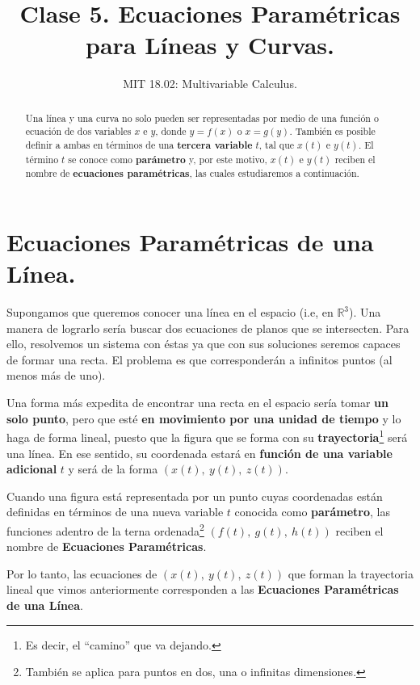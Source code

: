 \documentclass[12pt]{article}
\title{Clase 5. Ecuaciones Paramétricas para Líneas y Curvas.}
\author{MIT 18.02: Multivariable Calculus.}
\date{}
\begin{document}
\maketitle

\begin{abstract}
\noindent Una línea y una curva no solo pueden ser representadas por medio de una función o ecuación de dos variables $x$ e $y$, donde $y = f(x)$ o $x = g(y)$. También es posible definir a ambas en términos de una \textbf{tercera variable} $t$, tal que $x(t)$ e $y(t)$. El término $t$ se conoce como \textbf{parámetro} y, por este motivo, $x(t)$ e $y(t)$ reciben el nombre de \textbf{ecuaciones paramétricas}, las cuales estudiaremos a continuación.
\end{abstract}


\section{Ecuaciones Paramétricas de una Línea.}

Supongamos que queremos conocer una línea en el espacio (i.e, en $\mathbb{R}^{3}$). Una manera de lograrlo sería buscar dos ecuaciones de planos que se intersecten. Para ello, resolvemos un sistema con éstas ya que con sus soluciones seremos capaces de formar una recta. El problema es que corresponderán a infinitos puntos (al menos más de uno).

Una forma más expedita de encontrar una recta en el espacio sería tomar \textbf{un solo punto}, pero que esté \textbf{en movimiento por una unidad de tiempo} y lo haga de forma lineal, puesto que la figura que se forma con su \textbf{trayectoria}\footnote{Es decir,  el ``camino'' que va dejando.} será una línea. En ese sentido, su coordenada estará en \textbf{función de una variable adicional} $t$ y será de la forma $(x(t), \ y(t), \ z(t))$.

Cuando una figura está representada por un punto cuyas coordenadas están definidas en términos de una nueva variable $t$ conocida como \textbf{parámetro}, las funciones adentro de la terna ordenada\footnote{También se aplica para puntos en dos, una o infinitas dimensiones.} $(f(t), \ g(t), \ h(t))$ reciben el nombre de \textbf{Ecuaciones Paramétricas}.

Por lo tanto, las ecuaciones de $(x(t), \ y(t), \ z(t))$ que forman la trayectoria lineal que vimos anteriormente corresponden a las \textbf{Ecuaciones Paramétricas de una Línea}.

\newpage
\end{document}
